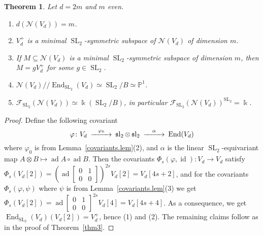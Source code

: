 \documentclass{amsart}
\newtheorem{thm}{Theorem}[section]
\theoremstyle{definition}
\theoremstyle{remark}
\begin{document}
\begin{thm}\label{d=4m.thm}
Let $d = 2m$ and $m$ even.
\begin{enumerate}
\item $d({\mathcal N}(V_{d})) = m$.
\item $V_{d}^{+}$ is a minimal ${\operatorname{SL}_{2}}$-symmetric subspace of ${\mathcal N}(V_{d})$ of dimension $m$.
\item If $M {\subseteq} {\mathcal N}(V_{d})$ is a minimal ${\operatorname{SL}_{2}}$-symmetric subspace of dimension $m$, then $M = gV_{d}^{+}$ for some $g \in{\operatorname{SL}_{2}}$.
\item ${\mathcal N}(V_{d}){/\!\!/} \operatorname{End}_{\operatorname{SL}_{2}}(V_{d}) \simeq {\operatorname{SL}_{2}}/B \simeq {\mathbb P}^{1}$.
\item ${\mathcal F}_{\operatorname{SL}_{2}}({\mathcal N}(V_{d})) \simeq {\Bbbk}({\operatorname{SL}_{2}}/B)$, in particular ${\mathcal F}_{\operatorname{SL}_{2}}({\mathcal N}(V_{d}))^{\operatorname{SL}_{2}} ={\Bbbk}$.
\end{enumerate}
\end{thm}
\begin{proof}
Define the following covariant
$$
\begin{CD}
{\varphi} \colon V_{d} @>{{\varphi}_{0}}>> \operatorname{{\mathfrak sl}_{2}}\otimes\operatorname{{\mathfrak sl}_{2}} @>{\alpha}>> \operatorname{End}(V_{d})
\end{CD}
$$
where ${\varphi}_{0}$ is from Lemma~\ref{covariants.lem}(2), and $\alpha$ is the linear ${\operatorname{SL}_{2}}$-equivariant map $A\otimes B \mapsto \operatorname{ad} A \circ \operatorname{ad} B$. Then the covariants $\Phi_{s}({\varphi},\operatorname{id})\colon V_{d}\to V_{d}$ satisfy
$\Phi_{s}(V_{d}[2]) = (\operatorname{ad}{\left[\begin{smallmatrix} 0 & 1 \\ 0 & 0\end{smallmatrix}\right]})^{2s} V_{d}[2]=V_{d}[4s + 2]$, and for the covariants $\Phi_{s}({\varphi},\psi)$ where $\psi$ is from Lemma~\ref{covariants.lem}(3) we get $\Phi_{s}(V_{d}[2]) = \operatorname{ad}{\left[\begin{smallmatrix} 0 & 1 \\ 0 & 0\end{smallmatrix}\right]}^{2s}V_{d}[4] = V_{d}[4s+4]$. As a consequence, we get  $\operatorname{End}_{\operatorname{SL}_{2}}(V_{d})(V_{d}[2]) = V_{d}^{+}$, hence (1) and (2). The remaining claims follow as in the proof of Theorem~\ref{thm3}.
\end{proof}
\end{document}
